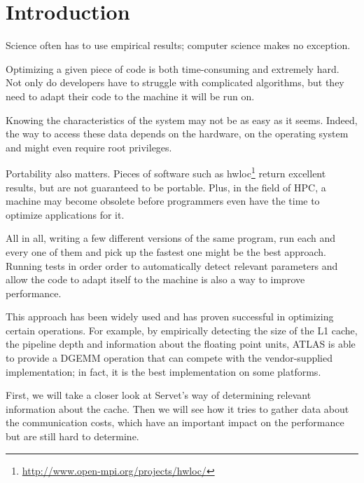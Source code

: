 \section{Introduction}
Science often has to use empirical results; computer science makes no
exception.

Optimizing a given piece of code is both time-consuming and extremely hard. Not
only do developers have to struggle with complicated algorithms, but they need
to adapt their code to the machine it will be run on.

Knowing the characteristics of the system may not be as easy as it seems.
Indeed, the way to access these data depends on the hardware, on the operating
system and might even require root privileges.

Portability also matters. Pieces of software such as
hwloc\footnote{\url{http://www.open-mpi.org/projects/hwloc/}} return excellent
results, but are not guaranteed to be portable. Plus, in the field of HPC, a
machine may become obsolete before programmers even have the time to optimize
applications for it\cite{ATLAS}\cite{Search_BLAS}.

All in all, writing a few different versions of the same program, run each and
every one of them and pick up the fastest one might be the best approach.
Running tests in order order to automatically detect relevant parameters and
allow the code to adapt itself to the machine is also a way to improve
performance.

This approach has been widely used and has proven successful in optimizing
certain operations. For example, by empirically detecting the size of the L1
cache, the pipeline depth and information about the floating point units, ATLAS
is able to provide a DGEMM operation that can compete with the vendor-supplied
implementation; in fact, it is the best implementation on some
platforms\cite{ATLAS}.

First, we will take a closer look at Servet's way of determining relevant
information about the cache. Then we will see how it tries to gather data about
the communication costs, which have an important impact on the performance but
are still hard to determine.
